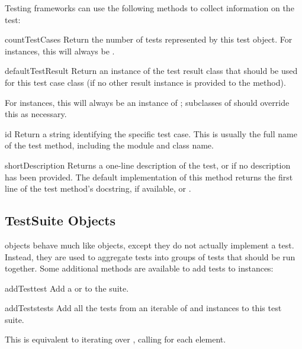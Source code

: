 Testing frameworks can use the following methods to collect
information on the test:

\begin{methoddesc}[TestCase]{countTestCases}{}
  Return the number of tests represented by this test object.  For
   instances, this will always be .
\end{methoddesc}

\begin{methoddesc}[TestCase]{defaultTestResult}{}
  Return an instance of the test result class that should be used
  for this test case class (if no other result instance is provided
  to the  method).
  
  For  instances, this will always be an instance of
  ;  subclasses of  should
  override this as necessary.
\end{methoddesc}

\begin{methoddesc}[TestCase]{id}{}
  Return a string identifying the specific test case.  This is usually
  the full name of the test method, including the module and class
  name.
\end{methoddesc}

\begin{methoddesc}[TestCase]{shortDescription}{}
  Returns a one-line description of the test, or  if no
  description has been provided.  The default implementation of this
  method returns the first line of the test method's docstring, if
  available, or .
\end{methoddesc}


\subsection{TestSuite Objects
            \label{testsuite-objects}}

 objects behave much like  objects,
except they do not actually implement a test.  Instead, they are used
to aggregate tests into groups of tests that should be run together.
Some additional methods are available to add tests to 
instances:

\begin{methoddesc}[TestSuite]{addTest}{test}
  Add a  or  to the suite.
\end{methoddesc}

\begin{methoddesc}[TestSuite]{addTests}{tests}
  Add all the tests from an iterable of  and
   instances to this test suite.
  
  This is equivalent to iterating over , calling
   for each element.
\end{methoddesc}

